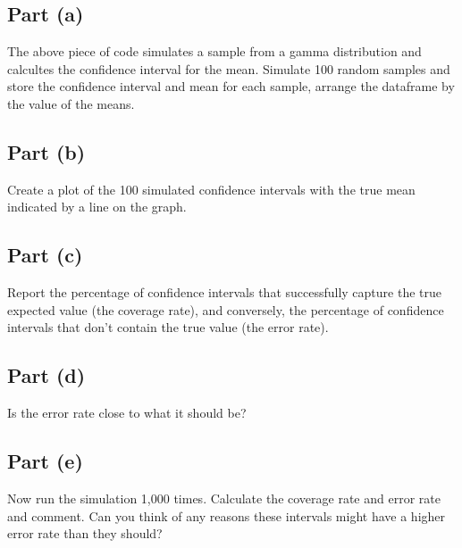 \documentclass[]{article}
\begin{document}
\subsection{Part (a)}\label{part-a-2}

The above piece of code simulates a sample from a gamma distribution and
calcultes the confidence interval for the mean. Simulate 100 random
samples and store the confidence interval and mean for each sample,
arrange the dataframe by the value of the means.

\subsection{Part (b)}\label{part-b-2}

Create a plot of the 100 simulated confidence intervals with the true
mean indicated by a line on the graph.

\subsection{Part (c)}\label{part-c}

Report the percentage of confidence intervals that successfully capture
the true expected value (the coverage rate), and conversely, the
percentage of confidence intervals that don't contain the true value
(the error rate).

\subsection{Part (d)}\label{part-d}

Is the error rate close to what it should be?

\subsection{Part (e)}\label{part-e}

Now run the simulation 1,000 times. Calculate the coverage rate and
error rate and comment. Can you think of any reasons these intervals
might have a higher error rate than they should?
\end{document}

